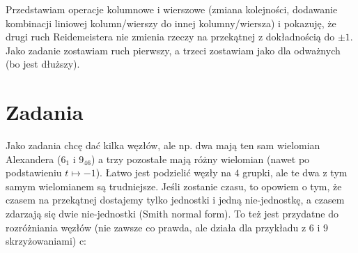 \documentclass{article}
\begin{document}
Przedstawiam operacje kolumnowe i wierszowe (zmiana kolejności, dodawanie kombinacji liniowej kolumn/wierszy do innej kolumny/wiersza) i pokazuję, że drugi ruch Reidemeistera nie zmienia rzeczy na przekątnej z dokładnością do $\pm1$. Jako zadanie zostawiam ruch pierwszy, a trzeci zostawiam jako dla odważnych (bo jest dłuższy).

\section{Zadania}

Jako zadania chcę dać kilka węzłów, ale np. dwa mają ten sam wielomian Alexandera ($6_1$ i $9_{46}$) a trzy pozostałe mają różny wielomian (nawet po podstawieniu $t\mapsto -1$). Łatwo jest podzielić węzły na $4$ grupki, ale te dwa z tym samym wielomianem są trudniejsze. Jeśli zostanie czasu, to opowiem o tym, że czasem na przekątnej dostajemy tylko jednostki i jedną nie-jednostkę, a czasem zdarzają się dwie nie-jednostki (Smith normal form). To też jest przydatne do rozróżniania węzłów (nie zawsze co prawda, ale działa dla przykładu z 6 i 9 skrzyżowaniami) c:
\end{document}
